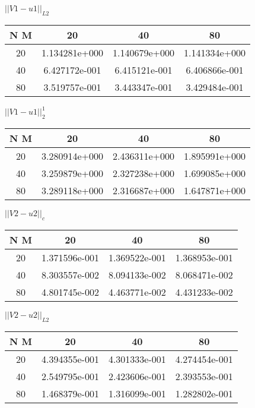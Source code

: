 \begin{center}
	$||V1 - u1||_{L2}$
	\begin{tabular}{|c|c|c|c|}
		\hline 
		N  M& 20& 40& 80\\ 
		\hline 
		20 & 1.134281e+000 & 1.140679e+000 & 1.141334e+000 \\ \hline 
		40 & 6.427172e-001 & 6.415121e-001 & 6.406866e-001 \\ \hline 
		80 & 3.519757e-001 & 3.443347e-001 & 3.429484e-001 \\ \hline 
		\hline 
	\end{tabular} 
\end{center} 
\begin{center}
	$||V1 - u1||_{2}^1$
	\begin{tabular}{|c|c|c|c|}
		\hline 
		N  M& 20& 40& 80\\ 
		\hline 
		20 & 3.280914e+000 & 2.436311e+000 & 1.895991e+000 \\ \hline 
		40 & 3.259879e+000 & 2.327238e+000 & 1.699085e+000 \\ \hline 
		80 & 3.289118e+000 & 2.316687e+000 & 1.647871e+000 \\ \hline 
		\hline 
	\end{tabular} 
\end{center} 
\begin{center}
	$||V2 - u2||_c$
	\begin{tabular}{|c|c|c|c|}
		\hline 
		N  M& 20& 40& 80\\ 
		\hline 
		20 & 1.371596e-001 & 1.369522e-001 & 1.368953e-001 \\ \hline 
		40 & 8.303557e-002 & 8.094133e-002 & 8.068471e-002 \\ \hline 
		80 & 4.801745e-002 & 4.463771e-002 & 4.431233e-002 \\ \hline 
		\hline 
	\end{tabular} 
\end{center} 
\begin{center}
	$||V2 - u2||_{L2}$
	\begin{tabular}{|c|c|c|c|}
		\hline 
		N  M& 20& 40& 80\\ 
		\hline 
		20 & 4.394355e-001 & 4.301333e-001 & 4.274454e-001 \\ \hline 
		40 & 2.549795e-001 & 2.423606e-001 & 2.393553e-001 \\ \hline 
		80 & 1.468379e-001 & 1.316099e-001 & 1.282802e-001 \\ \hline 
		\hline 
	\end{tabular} 
\end{center} 
